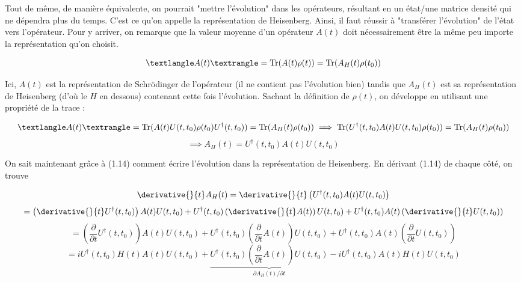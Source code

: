 Tout de même, de manière équivalente, on pourrait "mettre l'évolution" dans les opérateurs, résultant en un état/une matrice densité qui ne dépendra plus du temps. C'est ce qu'on appelle la représentation de Heisenberg. Ainsi, il faut réussir à "transférer l'évolution" de l'état vers l'opérateur. Pour y arriver, on remarque que la valeur moyenne d'un opérateur $A(t)$ doit nécessairement être la même peu importe la représentation qu'on choisit.

\begin{equation*}
    \textlangle A(t)\textrangle = \text{Tr}(A(t)\rho(t)) = \text{Tr}(A_H(t)\rho(t_0)) 
\end{equation*}

Ici, $A(t)$ est la représentation de Schrödinger de l'opérateur (il ne contient pas l'évolution bien) tandis que $A_H(t)$ est sa représentation de Heisenberg (d'où le $H$ en dessous) contenant cette fois l'évolution. Sachant la définition de $\rho(t)$, on développe en utilisant une propriété de la trace :

\begin{equation*}
    \textlangle A(t)\textrangle = \text{Tr}(A(t)U(t,t_0)\rho(t_0)U^\dagger(t,t_0)) = \text{Tr}(A_H(t)\rho(t_0)) \implies \text{Tr}(U^\dagger(t,t_0)A(t)U(t,t_0)\rho(t_0)) = \text{Tr}(A_H(t)\rho(t_0)) 
\end{equation*}
\begin{equation}
    \implies A_H(t) = U^\dagger(t,t_0)A(t)U(t,t_0)
\end{equation}

On sait maintenant grâce à (1.14) comment écrire l'évolution dans la représentation de Heisenberg. En dérivant (1.14) de chaque côté, on trouve 

\begin{equation*}
    \derivative{}{t}A_H(t) = \derivative{}{t}\left(U^\dagger(t,t_0)A(t)U(t,t_0)\right)
\end{equation*}
\begin{equation*}
    = \left(\derivative{}{t}U^\dagger(t,t_0)\right)A(t)U(t,t_0) + U^\dagger(t,t_0)\left(\derivative{}{t}A(t)\right)U(t,t_0) + U^\dagger(t,t_0)A(t)\left(\derivative{}{t}U(t,t_0)\right)
\end{equation*}
\begin{equation*}
    = \left(\frac{\partial}{\partial t}U^\dagger(t,t_0)\right)A(t)U(t,t_0) + U^\dagger(t,t_0)\left(\frac{\partial}{\partial t}A(t)\right)U(t,t_0) + U^\dagger(t,t_0)A(t)\left(\frac{\partial}{\partial t}U(t,t_0)\right)
\end{equation*}
\begin{equation*}
    = iU^\dagger(t,t_0)H(t)A(t)U(t,t_0) + \underbrace{U^\dagger(t,t_0)\left(\frac{\partial}{\partial t}A(t)\right)U(t,t_0)}_\text{$\partial A_H(t)/\partial t$} - iU^\dagger(t,t_0)A(t)H(t)U(t,t_0)
\end{equation*}

